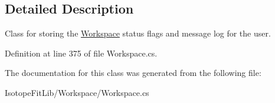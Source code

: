 \subsection{Detailed Description}
Class for storing the \hyperlink{class_isotope_fit_1_1_workspace}{Workspace} status flags and message log for the user. 



Definition at line 375 of file Workspace.\+cs.



The documentation for this class was generated from the following file\+:\begin{DoxyCompactItemize}
\item 
Isotope\+Fit\+Lib/\+Workspace/Workspace.\+cs\end{DoxyCompactItemize}
